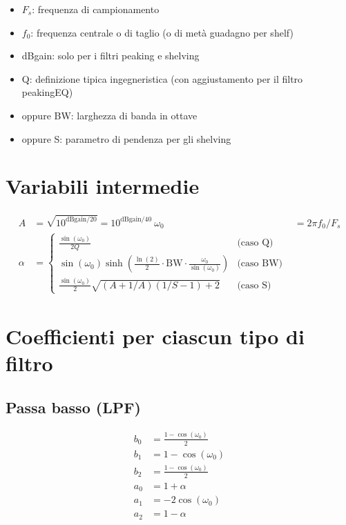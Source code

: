 \begin{itemize}
    \item $F_s$: frequenza di campionamento
    \item $f_0$: frequenza centrale o di taglio (o di metà guadagno per shelf)
    \item dBgain: solo per i filtri peaking e shelving
    \item Q: definizione tipica ingegneristica (con aggiustamento per il filtro peakingEQ)
    \item oppure BW: larghezza di banda in ottave
    \item oppure S: parametro di pendenza per gli shelving
\end{itemize}

\section*{Variabili intermedie}

\begin{align*}
A &= \sqrt{10^{\text{dBgain}/20}} = 10^{\text{dBgain}/40} \
\omega_0 &= 2\pi f_0 / F_s \\
\alpha &= \begin{cases}
    \frac{\sin(\omega_0)}{2Q} & \text{(caso Q)} \\
    \sin(\omega_0) \sinh \left( \frac{\ln(2)}{2} \cdot \text{BW} \cdot \frac{\omega_0}{\sin(\omega_0)} \right) & \text{(caso BW)} \\
    \frac{\sin(\omega_0)}{2} \sqrt{(A + 1/A)(1/S - 1) + 2} & \text{(caso S)}
\end{cases}
\end{align*}

\section*{Coefficienti per ciascun tipo di filtro}

\subsection*{Passa basso (LPF)}
\begin{align*}
b_0 &= \frac{1 - \cos(\omega_0)}{2} \\
b_1 &= 1 - \cos(\omega_0) \\
b_2 &= \frac{1 - \cos(\omega_0)}{2} \\
a_0 &= 1 + \alpha \\
a_1 &= -2 \cos(\omega_0) \\
a_2 &= 1 - \alpha
\end{align*}

